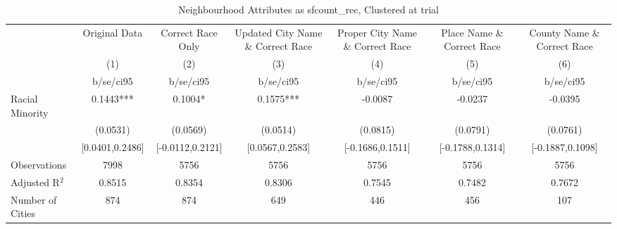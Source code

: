 \documentclass{article}
\begin{document}
\begin{table}[htbp]\centering
\def\sym#1{\ifmmode^{#1}\else\(^{#1}\)\fi}
\caption{Neighbourhood Attributes as sfcount\_rec, Clustered at trial}
\begin{tabular}{l*{6}{c}}
\toprule
                    &\multicolumn{1}{c}{Original Data}&\multicolumn{1}{c}{Correct Race Only}&\multicolumn{1}{c}{Updated City Name \& Correct Race}&\multicolumn{1}{c}{Proper City Name \& Correct Race}&\multicolumn{1}{c}{Place Name \& Correct Race}&\multicolumn{1}{c}{County Name \& Correct Race}\\\cmidrule(lr){2-2}\cmidrule(lr){3-3}\cmidrule(lr){4-4}\cmidrule(lr){5-5}\cmidrule(lr){6-6}\cmidrule(lr){7-7}
                    &\multicolumn{1}{c}{(1)}   &\multicolumn{1}{c}{(2)}   &\multicolumn{1}{c}{(3)}   &\multicolumn{1}{c}{(4)}   &\multicolumn{1}{c}{(5)}   &\multicolumn{1}{c}{(6)}   \\
                    &   b/se/ci95   &   b/se/ci95   &   b/se/ci95   &   b/se/ci95   &   b/se/ci95   &   b/se/ci95   \\
\midrule
Racial Minority     &      0.1443***&      0.1004*  &      0.1575***&     -0.0087   &     -0.0237   &     -0.0395   \\
                    &    (0.0531)   &    (0.0569)   &    (0.0514)   &    (0.0815)   &    (0.0791)   &    (0.0761)   \\
                    &[0.0401,0.2486]   &[-0.0112,0.2121]   &[0.0567,0.2583]   &[-0.1686,0.1511]   &[-0.1788,0.1314]   &[-0.1887,0.1098]   \\
\midrule
Observations        &        7998   &        5756   &        5756   &        5756   &        5756   &        5756   \\
Adjusted R$^2$      &      0.8515   &      0.8354   &      0.8306   &      0.7545   &      0.7482   &      0.7672   \\
Number of Cities    &         874   &         874   &         649   &         446   &         456   &         107   \\
\bottomrule
\end{tabular}
\end{table}
\end{document}
